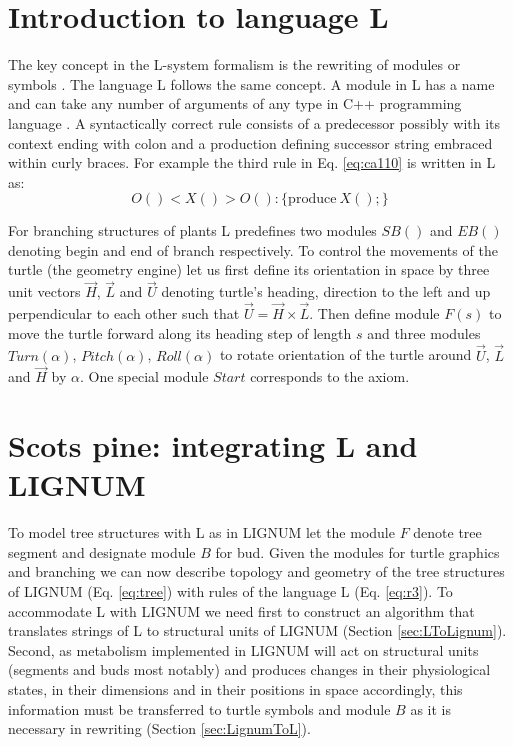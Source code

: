 \section{Introduction to language L}

The key concept in the  L-system formalism is the rewriting of modules
or symbols \citep{pp:89}.  The language  L follows the same concept. A
module in  L has a name  and can take  any number of arguments  of any
type   in   C++   programming   language   \citep{stroustrup:97}.    A
syntactically correct rule consists of a predecessor possibly with its
context ending  with colon and a production  defining successor string
embraced within curly braces.  For example the third rule in Eq.
\ref{eq:ca110} is written in L as:
\begin{equation}\label{eq:r3}
 O() < X() > O(): \{\mathrm{produce}\ X();\}
\end{equation}

For branching structures of plants L predefines two modules $SB()$ and
$EB()$ denoting begin and end  of branch respectively.  To control the
movements of the turtle (the  geometry engine) let us first define its
orientation  in space by  three unit  vectors $\vec  H$, $\vec  L$ and
$\vec  U$ denoting  turtle's heading,  direction  to the  left and  up
perpendicular to each other such that $\vec U = \vec H \times \vec L$.
Then define module $F(s)$ to move the turtle forward along its heading
step of length $s$  and three modules $Turn(\alpha)$, $Pitch(\alpha)$,
$Roll(\alpha)$ to  rotate orientation of  the turtle around  $\vec U$,
$\vec  L$  and $\vec  H$  by  $\alpha$.   One special  module  $Start$
corresponds to the axiom.


\section{Scots pine: integrating L and LIGNUM}\label{sec:pine}

To model tree structures with L as in LIGNUM let the module $F$ denote
tree segment and designate module  $B$ for bud.  Given the modules for
turtle  graphics  and  branching  we  can now  describe  topology  and
geometry of  the tree structures  of LIGNUM (Eq.   \ref{eq:tree}) with
rules of  the language  L (Eq.  \ref{eq:r3}).   To accommodate  L with
LIGNUM we need first to construct an algorithm that translates strings
of L to structural units of LIGNUM (Section \ref{sec:LToLignum}).  Second,
as  metabolism implemented  in  LIGNUM will  act  on structural  units
(segments  and  buds  most  notably)  and produces  changes  in  their
physiological states,  in their dimensions  and in their  positions in
space  accordingly, this  information  must be  transferred to  turtle
symbols  and module  $B$  as  it is  necessary  in rewriting  (Section
\ref{sec:LignumToL}).

